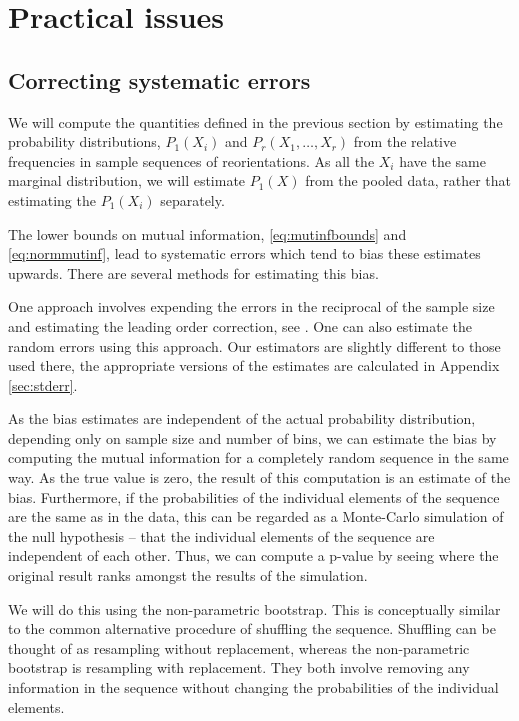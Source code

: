 \documentclass[12pt]{article}
\begin{document}
\section{Practical issues}\label{sec:practical}

\subsection{Correcting systematic errors}\label{sec:syscorr}

We will compute the quantities defined in the previous section by estimating the probability distributions, $P_1(X_i)$ and $P_r(X_1,\ldots,X_r)$ from the relative frequencies in sample sequences of reorientations. As all the $X_i$ have the same marginal distribution, we will estimate $P_1(X)$ from the pooled data, rather that estimating the $P_1(X_i)$ separately.


The lower bounds on mutual information, \eqref{eq:mutinfbounds} and \eqref{eq:normmutinf}, lead to systematic errors which tend to bias these estimates upwards. There are several methods for estimating this bias.

One approach involves expending the errors in the reciprocal of the sample size and estimating the leading order correction, see \cite{Roulston1999}. One can also estimate the random errors using this approach. Our estimators are slightly different to those used there, the appropriate versions of the estimates are calculated in Appendix \ref{sec:stderr}.

As the bias estimates are independent of the actual probability distribution, depending only on sample size and number of bins, we can estimate the bias by computing the mutual information for a completely random sequence in the same way. As the true value is zero, the result of this computation is an estimate of the bias. Furthermore, if the probabilities of the individual elements of the sequence are the same as in the data, this can be regarded as a Monte-Carlo simulation of the null hypothesis -- that the individual elements of the sequence are independent of each other. Thus, we can compute a p-value by seeing where the original result ranks amongst the results of the simulation.

We will do this using the non-parametric bootstrap. This is conceptually similar to the common alternative procedure of shuffling the sequence. Shuffling can be thought of as resampling without replacement, whereas the non-parametric bootstrap is resampling with replacement. They both involve removing any information in the sequence without changing the probabilities of the individual elements.
\end{document}
